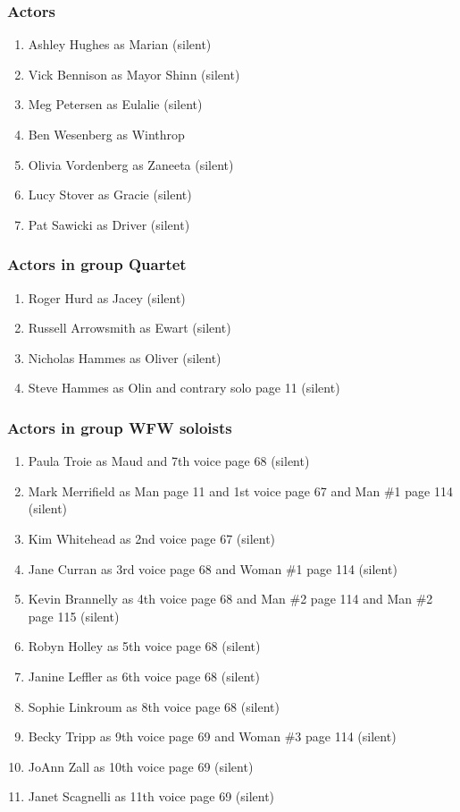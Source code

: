 \subsubsection{Actors}
\begin{enumerate}
\item Ashley Hughes as Marian (silent)
\item Vick Bennison as Mayor Shinn (silent)
\item Meg Petersen as Eulalie (silent)
\item Ben Wesenberg as Winthrop
\item Olivia Vordenberg as Zaneeta (silent)
\item Lucy Stover as Gracie (silent)
\item Pat Sawicki as Driver (silent)
\end{enumerate}
\subsubsection{Actors in group Quartet}
\begin{enumerate}
\item Roger Hurd as Jacey (silent)
\item Russell Arrowsmith as Ewart (silent)
\item Nicholas Hammes as Oliver (silent)
\item Steve Hammes as Olin and contrary solo page 11 (silent)
\end{enumerate}
\subsubsection{Actors in group WFW soloists}
\begin{enumerate}
\item Paula Troie as Maud and 7th voice page 68 (silent)
\item Mark Merrifield as Man page 11 and 1st voice page 67 and Man \#1 page 114 (silent)
\item Kim Whitehead as 2nd voice page 67 (silent)
\item Jane Curran as 3rd voice page 68 and Woman \#1 page 114 (silent)
\item Kevin Brannelly as 4th voice page 68 and Man \#2 page 114 and Man \#2 page 115 (silent)
\item Robyn Holley as 5th voice page 68 (silent)
\item Janine Leffler as 6th voice page 68 (silent)
\item Sophie Linkroum as 8th voice page 68 (silent)
\item Becky Tripp as 9th voice page 69 and Woman \#3 page 114 (silent)
\item JoAnn Zall as 10th voice page 69 (silent)
\item Janet Scagnelli as 11th voice page 69 (silent)
\end{enumerate}

